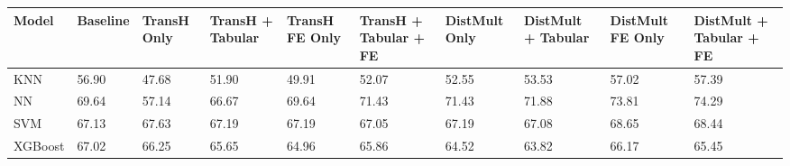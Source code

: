 \begin{tabular}{llllllllll}
\toprule
Model & Baseline & TransH Only & TransH + Tabular & TransH FE Only & TransH + Tabular + FE & DistMult Only & DistMult + Tabular & DistMult FE Only & DistMult + Tabular + FE \\
\midrule
KNN & 56.90 & 47.68 & 51.90 & 49.91 & 52.07 & 52.55 & 53.53 & 57.02 & 57.39 \\
NN & 69.64 & 57.14 & 66.67 & 69.64 & 71.43 & 71.43 & 71.88 & 73.81 & 74.29 \\
SVM & 67.13 & 67.63 & 67.19 & 67.19 & 67.05 & 67.19 & 67.08 & 68.65 & 68.44 \\
XGBoost & 67.02 & 66.25 & 65.65 & 64.96 & 65.86 & 64.52 & 63.82 & 66.17 & 65.45 \\
\bottomrule
\end{tabular}

